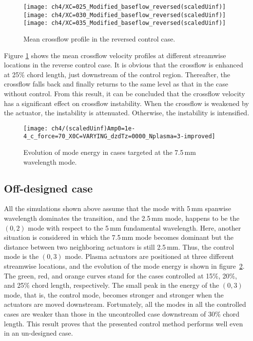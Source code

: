 \begin{figure}
\centering
\texttt{[image: ch4/XC=025\_Modified\_baseflow\_reversed(scaledUinf)]}
\texttt{[image: ch4/XC=030\_Modified\_baseflow\_reversed(scaledUinf)]}
\texttt{[image: ch4/XC=035\_Modified\_baseflow\_reversed(scaledUinf)]}
\caption{Mean crossflow profile in the reversed control case.}%
\label{f:inverse_meanflow}
\end{figure}

Figure \ref{f:inverse_meanflow} shows the mean crossflow velocity profiles at different streamwise locations in the reverse control case. It is obvious that the crossflow is enhanced at 25\% chord length, just downstream of the control region. Thereafter, the crossflow falls back and finally returns to the same level as that in the case without control. From this result, it can be concluded that the crossflow velocity has a significant effect on  crossflow instability. When the crossflow is weakened by the actuator, the instability is attenuated. Otherwise, the instability is intensified.
\begin{figure}
\centering
\texttt{[image: ch4/(scaledUinf)Amp0=1e-4\_c\_force=70\_X0C=VARYING\_dzdTz=0000\_Nplasma=3-improved]}
\caption{Evolution of mode energy in cases targeted at the 7.5\,mm wavelength mode.}%
\label{f:7.5mm}
\end{figure}
\subsection{Off-designed case}
All the simulations shown above assume that the mode with 5\,mm spanwise wavelength dominates the transition, and the 2.5\,mm mode, happens to be the $(0,2)$ mode with respect to the 5\,mm fundamental wavelength. Here, another situation is considered in which the 7.5\,mm mode becomes dominant but the distance between two neighboring actuators is still 2.5\,mm. Thus, the control mode is the $(0,3)$ mode. Plasma actuators are positioned at three different streamwise locations, and the evolution of the mode energy is shown in figure~\ref{f:7.5mm}. The green, red, and orange curves stand for the cases controlled at 15\%, 20\%, and 25\% chord length, respectively. The small peak in the energy of the $(0,3)$ mode, that is, the control mode, becomes stronger and stronger when the actuators are moved downstream. Fortunately, all the modes in all the controlled cases are weaker than those in the uncontrolled case downstream of 30\% chord length. This result proves that the presented control method performs well even in an un-designed case.
